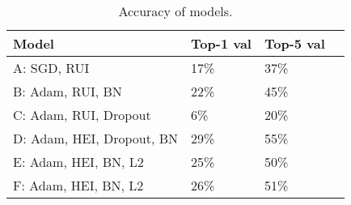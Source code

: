 

\begin{table}[htbp]
\begin{center}
\begin{tabular}{|l|l|l|l|}
\hline
\textbf{Model} & \textbf{Top-1 val} & \textbf{Top-5 val}  \\
\hline
          A: SGD, RUI                &   17\%  		  &  37\% \\
          B: Adam, RUI, BN           &   22\%  		  &  45\% \\
          C: Adam, RUI, Dropout      &   6\%      	&  20\% \\
          D: Adam, HEI, Dropout, BN  &   29\%  	    &  55\% \\
          E: Adam, HEI, BN, L2       &   25\%       &  50\% \\
          F: Adam, HEI, BN, L2       &   26\%       &  51\% \\

\hline
\end{tabular}
\caption[]
{\small
Accuracy of models.
}
\label{table:accuracy}
\end{center}
\end{table}
